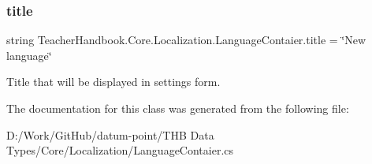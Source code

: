 \subsubsection{\texorpdfstring{title}{title}}
{\footnotesize\ttfamily string Teacher\+Handbook.\+Core.\+Localization.\+Language\+Contaier.\+title = \char`\"{}New language\char`\"{}}



Title that will be displayed in settings form. 



The documentation for this class was generated from the following file\+:\begin{DoxyCompactItemize}
\item 
D\+:/\+Work/\+Git\+Hub/datum-\/point/\+T\+H\+B Data Types/\+Core/\+Localization/Language\+Contaier.\+cs\end{DoxyCompactItemize}
